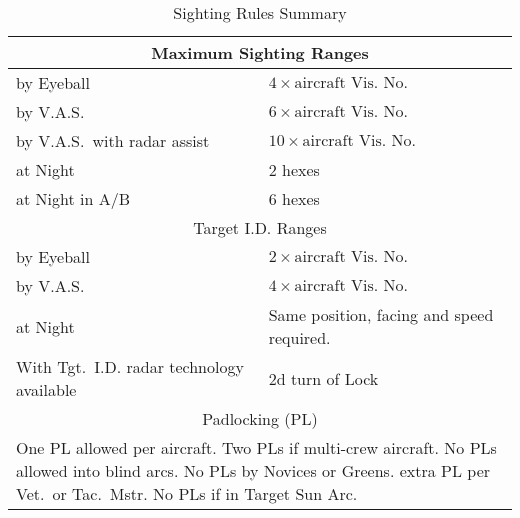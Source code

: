 \begin{table}
\centering
\caption{Sighting Rules Summary}
\medskip
\begin{tabular}{p{12em}p{12em}}
\hline
\multicolumn{2}{c}{Maximum Sighting Ranges}\\
\hline
by Eyeball&$4 \times \mbox{aircraft Vis.\ No.}$\\
by V.A.S. &$6 \times \mbox{aircraft Vis.\ No.}$\\
by V.A.S.\ with radar assist&$10 \times \mbox{aircraft Vis.\ No.}$\\
at Night&2 hexes\\
at Night in A/B&6 hexes\\
\hline
\multicolumn{2}{c}{Target I.D. Ranges}\\
\hline
by Eyeball&$2 \times \mbox{aircraft Vis.\ No.}$\\
by V.A.S. &$4 \times \mbox{aircraft Vis.\ No.}$\\
at Night&Same position, facing and speed required.\\
With Tgt.\ I.D. radar technology available&2d turn of Lock\\
\hline
\multicolumn{2}{c}{Padlocking (PL)}\\
\hline
\multicolumn{2}{p{24em}}{
One PL allowed per aircraft.\newline
Two PLs if multi-crew aircraft.\newline
No PLs allowed into blind arcs.\newline
No PLs by Novices or Greens.\newline
1 extra PL per Vet.\ or Tac.\ Mstr.\newline
No PLs if in Target Sun Arc.
}\\
\hline
\end{tabular}
\end{table}

